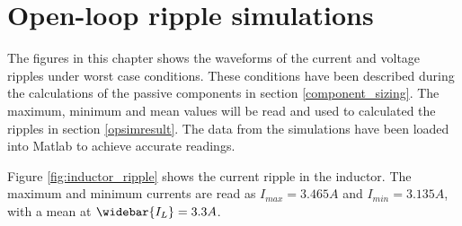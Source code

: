 
\chapter{Open-loop ripple simulations} \label{app:OL_ripple}
The figures in this chapter shows the waveforms of the current and voltage ripples under worst case conditions. These conditions have been described during the calculations of the passive components in section \ref{component_sizing}. The maximum, minimum and mean values will be read and used to calculated the ripples in section \ref{opsimresult}. The data from the simulations have been loaded into Matlab to achieve accurate readings.

Figure \ref{fig:inductor_ripple} shows the current ripple in the inductor. The maximum and minimum currents are read as $I_{max} = 3.465A$ and $I_{min} = 3.135A$, with a mean at $\widebar{I_L} = 3.3A$.


